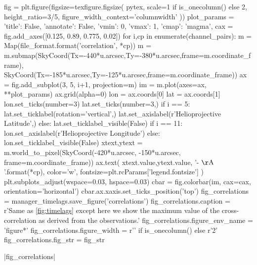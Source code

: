 \begin{pycode}
fig = plt.figure(figsize=texfigure.figsize(
    pytex,
    scale=1 if is_onecolumn() else 2,
    height_ratio=3/5,
    figure_width_context='columnwidth'
))
plot_params = {
    'title': False, 
    'annotate': False,
    'vmin': 0,
    'vmax': 1,
    'cmap': 'magma',
}
cax = fig.add_axes([0.125, 0.89, 0.775, 0.02])
for i,cp in enumerate(channel_pairs):
    m = Map(file_format.format('correlation', *cp))
    m = m.submap(SkyCoord(Tx=-440*u.arcsec,Ty=-380*u.arcsec,frame=m.coordinate_frame),
                 SkyCoord(Tx=-185*u.arcsec,Ty=-125*u.arcsec,frame=m.coordinate_frame))
    ax = fig.add_subplot(3, 5, i+1, projection=m)
    im = m.plot(axes=ax, **plot_params)
    ax.grid(alpha=0)
    lon = ax.coords[0]
    lat = ax.coords[1]
    lon.set_ticks(number=3)
    lat.set_ticks(number=3,) 
    if i == 5:
        lat.set_ticklabel(rotation='vertical',)
        lat.set_axislabel(r'Helioprojective Latitude',)
    else:
        lat.set_ticklabel_visible(False)
    if i == 11:
        lon.set_axislabel(r'Helioprojective Longitude')
    else:
        lon.set_ticklabel_visible(False)
    xtext,ytext = m.world_to_pixel(SkyCoord(-420*u.arcsec, -150*u.arcsec, frame=m.coordinate_frame))
    ax.text(
        xtext.value,ytext.value,
        '{}-{} $\mathrm{{\AA}}$'.format(*cp),
        color='w',
        fontsize=plt.rcParams['legend.fontsize']
    )
plt.subplots_adjust(wspace=0.03, hspace=0.03)
cbar = fig.colorbar(im, cax=cax, orientation='horizontal')
cbar.ax.xaxis.set_ticks_position('top')
fig_correlations = manager_timelags.save_figure('correlations')
fig_correlations.caption = r'Same as \autoref{fig:timelags} except here we show the maximum value of the cross-correlation as derived from the observations.'
fig_correlations.figure_env_name = 'figure*'
fig_correlations.figure_width = r'\columnwidth' if is_onecolumn() else r'2\columnwidth'
fig_correlations.fig_str = fig_str
\end{pycode}
|fig_correlations|



